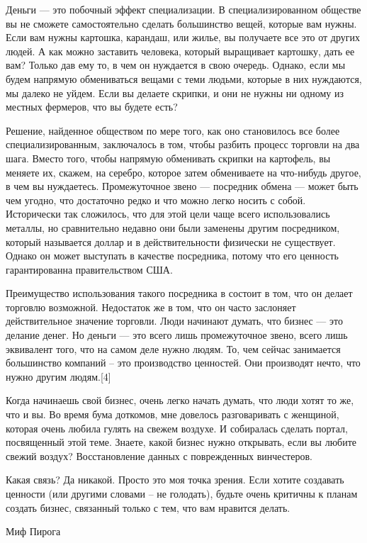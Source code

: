 \documentclass[ebook,12pt,oneside,openany]{memoir}
\begin{document}
Деньги — это побочный эффект специализации. В специализированном
обществе вы не сможете самостоятельно сделать большинство вещей,
которые вам нужны. Если вам нужны картошка, карандаш, или жилье, вы
получаете все это от других людей. А как можно заставить человека,
который выращивает картошку, дать ее вам? Только дав ему то, в чем он
нуждается в свою очередь. Однако, если мы будем напрямую обмениваться
вещами с теми людьми, которые в них нуждаются, мы далеко не уйдем.
Если вы делаете скрипки, и они не нужны ни одному из местных фермеров,
что вы будете есть?

Решение, найденное обществом по мере того, как оно становилось все
более специализированным, заключалось в том, чтобы разбить процесс
торговли на два шага. Вместо того, чтобы напрямую обменивать скрипки
на картофель, вы меняете их, скажем, на серебро, которое затем
обмениваете на что-нибудь другое, в чем вы нуждаетесь. Промежуточное
звено — посредник обмена — может быть чем угодно, что достаточно редко
и что можно легко носить с собой. Исторически так сложилось, что для
этой цели чаще всего использовались металлы, но сравнительно недавно
они были заменены другим посредником, который называется доллар и в
действительности физически не существует. Однако он может выступать в
качестве посредника, потому что его ценность гарантированна
правительством США.

Преимущество использования такого посредника в состоит в том, что он
делает торговлю возможной. Недостаток же в том, что он часто заслоняет
действительное значение торговли. Люди начинают думать, что бизнес —
это делание денег. Но деньги — это всего лишь промежуточное звено,
всего лишь эквивалент того, что на самом деле нужно людям. То, чем
сейчас занимается большинство компаний – это производство ценностей.
Они производят нечто, что нужно другим людям.[4]

Когда начинаешь свой бизнес, очень легко начать думать, что люди хотят
то же, что и вы. Во время бума доткомов, мне довелось разговаривать с
женщиной, которая очень любила гулять на свежем воздухе. И собиралась
сделать портал, посвященный этой теме. Знаете, какой бизнес нужно
открывать, если вы любите свежий воздух? Восстановление данных с
поврежденных винчестеров.

Какая связь? Да никакой. Просто это моя точка зрения. Если хотите
создавать ценности (или другими словами – не голодать), будьте очень
критичны к планам создать бизнес, связанный только с тем, что вам
нравится делать.

Миф Пирога
\end{document}
